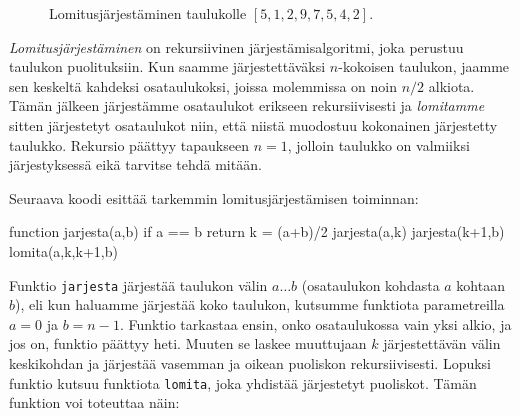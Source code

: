 \begin{figure}
\caption{Lomitusjärjestäminen taulukolle $[5,1,2,9,7,5,4,2]$.}
\label{fig:lomjar}
\end{figure}

\emph{Lomitusjärjestäminen} on rekursiivinen järjestämisalgoritmi,
joka perustuu taulukon puolituksiin.
Kun saamme järjestettäväksi $n$-kokoisen taulukon,
jaamme sen keskeltä kahdeksi osataulukoksi,
joissa molemmissa on noin $n/2$ alkiota.
Tämän jälkeen järjestämme osataulukot erikseen rekursiivisesti
ja \emph{lomitamme} sitten järjestetyt osataulukot niin,
että niistä muodostuu kokonainen järjestetty taulukko.
Rekursio päättyy tapaukseen $n=1$, jolloin
taulukko on valmiiksi järjestyksessä eikä
tarvitse tehdä mitään.

Seuraava koodi esittää tarkemmin lomitusjärjestämisen toiminnan:

\begin{code}
function jarjesta(a,b)
    if a == b
        return
    k = (a+b)/2
    jarjesta(a,k)
    jarjesta(k+1,b)
    lomita(a,k,k+1,b)
\end{code}

Funktio \texttt{jarjesta} järjestää taulukon
välin $a \dots b$ (osataulukon kohdasta
$a$ kohtaan $b$), eli kun haluamme järjestää koko taulukon,
kutsumme funktiota parametreilla $a=0$ ja $b=n-1$.
Funktio tarkastaa ensin, onko osataulukossa vain yksi alkio,
ja jos on, funktio päättyy heti.
Muuten se laskee muuttujaan $k$ järjestettävän välin keskikohdan
ja järjestää vasemman ja oikean puoliskon rekursiivisesti.
Lopuksi funktio kutsuu funktiota \texttt{lomita},
joka yhdistää järjestetyt puoliskot.
Tämän funktion voi toteuttaa näin:

